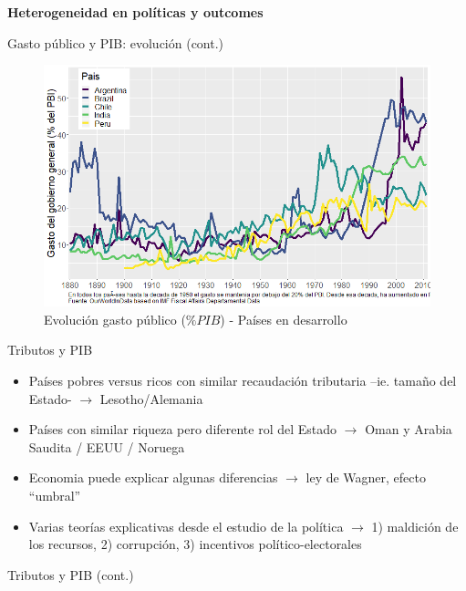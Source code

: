 \documentclass[
  ignorenonframetext,
]{beamer}
\providecommand{\tightlist}{%
  \setlength{\itemsep}{0pt}\setlength{\parskip}{0pt}}\usepackage{longtable,booktabs,array}
\begin{document}
\begin{frame}{\textbf{Heterogeneidad en políticas y outcomes}}
\begin{block}{Gasto público y PIB: evolución (cont.)}
\protect\hypertarget{gasto-puxfablico-y-pib-evoluciuxf3n-cont.-1}{}
\begin{figure}

{\centering \includegraphics{fig/fig-01-003.png}

}

\caption{Evolución gasto público (\(\%PIB\)) - Países en desarrollo}

\end{figure}
\end{block}

\begin{block}{Tributos y PIB}
\protect\hypertarget{tributos-y-pib}{}
\begin{itemize}
\tightlist
\item
  Países pobres versus ricos con similar recaudación tributaria --ie.
  tamaño del Estado- \(\longrightarrow\) Lesotho/Alemania
\item
  Países con similar riqueza pero diferente rol del Estado
  \(\longrightarrow\) Oman y Arabia Saudita / EEUU / Noruega
\item
  Economia puede explicar algunas diferencias \(\longrightarrow\) ley de
  Wagner, efecto ``umbral''
\item
  Varias teorías explicativas desde el estudio de la política
  \(\longrightarrow\) 1) maldición de los recursos, 2) corrupción, 3)
  incentivos político-electorales
\end{itemize}
\end{block}

\begin{block}{Tributos y PIB (cont.)}
\protect\hypertarget{tributos-y-pib-cont.}{}
\begin{figure}


\end{figure}
\end{block}
\end{frame}
\end{document}
